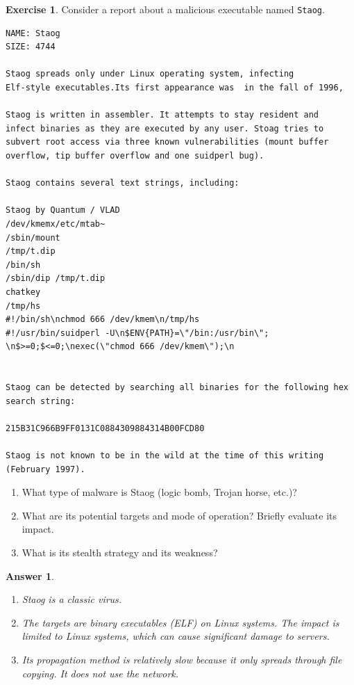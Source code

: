 \documentclass[a4paper,11pt]{article}
\theoremstyle{plain}
\newtheorem{correction}{Answer}
\theoremstyle{definition}
\newtheorem{exercice}{Exercise}
\begin{document}
\begin{exercice}
Consider a report about a malicious executable named \texttt{Staog}.
\begin{verbatim}
NAME: Staog
SIZE: 4744

Staog spreads only under Linux operating system, infecting
Elf-style executables.Its first appearance was  in the fall of 1996,

Staog is written in assembler. It attempts to stay resident and
infect binaries as they are executed by any user. Stoag tries to
subvert root access via three known vulnerabilities (mount buffer
overflow, tip buffer overflow and one suidperl bug).

Staog contains several text strings, including:

Staog by Quantum / VLAD
/dev/kmemx/etc/mtab~
/sbin/mount
/tmp/t.dip
/bin/sh
/sbin/dip /tmp/t.dip
chatkey
/tmp/hs
#!/bin/sh\nchmod 666 /dev/kmem\n/tmp/hs
#!/usr/bin/suidperl -U\n$ENV{PATH}=\"/bin:/usr/bin\";
\n$>=0;$<=0;\nexec(\"chmod 666 /dev/kmem\");\n


Staog can be detected by searching all binaries for the following hex
search string:

215B31C966B9FF0131C0884309884314B00FCD80

Staog is not known to be in the wild at the time of this writing
(February 1997).
\end{verbatim}

\begin{enumerate}
\item What type of malware is Staog (logic bomb, Trojan horse, etc.)?
\item What are its potential targets and mode of operation? Briefly evaluate its impact.
\item What is its stealth strategy and its weakness?
\end{enumerate}

\end{exercice}

\begin{correction}
\begin{enumerate}
\item Staog is a classic virus.
\item The targets are binary executables (ELF) on Linux systems. The impact is limited to Linux systems, which can cause significant damage to servers.
\item Its propagation method is relatively slow because it only spreads through file copying. It does not use the network.
\end{enumerate}
\end{correction}
\end{document}
